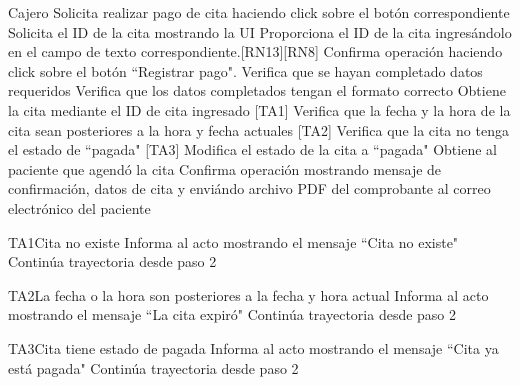 \begin{UCtrayectoria}{Cajero}
		\UCpaso[\UCactor] Solicita realizar pago de cita haciendo click sobre el botón correspondiente
		\UCpaso Solicita el ID de la cita mostrando la UI 
		\UCpaso[\UCactor] Proporciona el ID de la cita ingresándolo en el campo de texto correspondiente.[RN13][RN8]
		\UCpaso[\UCactor] Confirma operación haciendo click sobre el botón ``Registrar pago".
		\UCpaso Verifica que se hayan completado datos requeridos
		\UCpaso Verifica que los datos completados tengan el formato correcto
		\UCpaso Obtiene la cita mediante el ID de cita ingresado [TA1]
		\UCpaso Verifica que la fecha y la hora de la cita sean posteriores a la hora y fecha actuales [TA2]
		\UCpaso Verifica que la cita no tenga el estado de ``pagada" [TA3]
		\UCpaso Modifica el estado de la cita a ``pagada"
		\UCpaso Obtiene al paciente que agendó la cita 
		\UCpaso Confirma operación mostrando mensaje de confirmación, datos de cita y enviándo archivo PDF del comprobante  al correo electrónico del paciente
\end{UCtrayectoria}

\begin{UCtrayectoriaA}{TA1}{Cita no existe}
	\UCpaso Informa al acto mostrando el mensaje ``Cita no existe"
	\UCpaso Continúa trayectoria desde paso 2
	
\end{UCtrayectoriaA}
	
\begin{UCtrayectoriaA}{TA2}{La fecha o la hora son posteriores a la fecha y hora actual}
	\UCpaso Informa al acto mostrando el mensaje ``La cita expiró"
	\UCpaso Continúa trayectoria desde paso 2
	
\end{UCtrayectoriaA}

\begin{UCtrayectoriaA}{TA3}{Cita tiene estado de pagada}
	\UCpaso Informa al acto mostrando el mensaje ``Cita ya está pagada"
	\UCpaso Continúa trayectoria desde paso 2
	
\end{UCtrayectoriaA}

